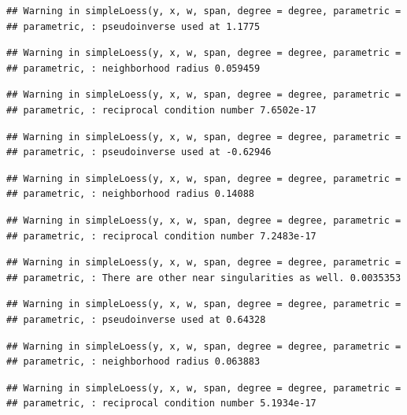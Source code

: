 \documentclass[]{article}
\begin{document}
\begin{verbatim}
## Warning in simpleLoess(y, x, w, span, degree = degree, parametric =
## parametric, : pseudoinverse used at 1.1775
\end{verbatim}

\begin{verbatim}
## Warning in simpleLoess(y, x, w, span, degree = degree, parametric =
## parametric, : neighborhood radius 0.059459
\end{verbatim}

\begin{verbatim}
## Warning in simpleLoess(y, x, w, span, degree = degree, parametric =
## parametric, : reciprocal condition number 7.6502e-17
\end{verbatim}

\begin{verbatim}
## Warning in simpleLoess(y, x, w, span, degree = degree, parametric =
## parametric, : pseudoinverse used at -0.62946
\end{verbatim}

\begin{verbatim}
## Warning in simpleLoess(y, x, w, span, degree = degree, parametric =
## parametric, : neighborhood radius 0.14088
\end{verbatim}

\begin{verbatim}
## Warning in simpleLoess(y, x, w, span, degree = degree, parametric =
## parametric, : reciprocal condition number 7.2483e-17
\end{verbatim}

\begin{verbatim}
## Warning in simpleLoess(y, x, w, span, degree = degree, parametric =
## parametric, : There are other near singularities as well. 0.0035353
\end{verbatim}

\begin{verbatim}
## Warning in simpleLoess(y, x, w, span, degree = degree, parametric =
## parametric, : pseudoinverse used at 0.64328
\end{verbatim}

\begin{verbatim}
## Warning in simpleLoess(y, x, w, span, degree = degree, parametric =
## parametric, : neighborhood radius 0.063883
\end{verbatim}

\begin{verbatim}
## Warning in simpleLoess(y, x, w, span, degree = degree, parametric =
## parametric, : reciprocal condition number 5.1934e-17
\end{verbatim}
\end{document}
